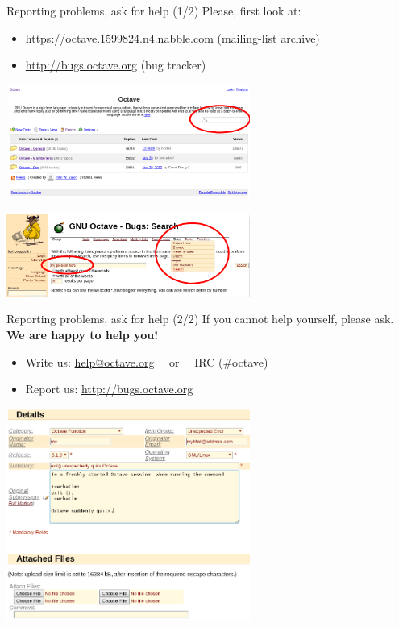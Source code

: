 \begin{frame}{Reporting problems, ask for help (1/2)}
Please, first look at:
\begin{itemize}
\item
{\color{DarkBlue}\url{https://octave.1599824.n4.nabble.com}}
(mailing-list archive)
\item
{\color{DarkBlue}\url{http://bugs.octave.org}} (bug tracker)
\end{itemize}
\begin{center}
\includegraphics[width=0.6\textwidth]{res/images/nabble_mailing_list_search}

\includegraphics[width=0.6\textwidth]{res/images/savannah_bug_search}
\end{center}
\end{frame}



\begin{frame}{Reporting problems, ask for help (2/2)}
If you cannot help yourself, please ask.
\textbf{We are happy to help you!}
\begin{itemize}
\itemsep0.2em
\item
Write us: {\color{DarkBlue}\url{help@octave.org}}
$\quad$or$\quad$ IRC (\#octave)
\item
Report us: {\color{DarkBlue}\url{http://bugs.octave.org}}
\end{itemize}
\begin{center}
\includegraphics[width=0.6\textwidth]{res/images/savannah_bug_report}
\end{center}
\end{frame}
